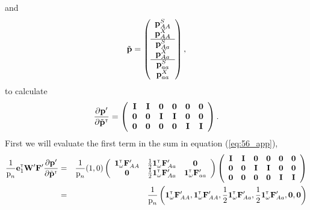 \documentclass[11pt]{article}
\newcommand{\bo}[1]{{\bf #1}}
\newcommand{\tr}{{\mbox{\tiny \sf T}}}
\begin{document}
and 
\begin{equation}
  \tilde{\bo p}=\left(\begin{array} {c}
\mathbf{p}_{AA}^S\\
\mathbf{p}_{AA}^X\\
\hline
\mathbf{p}_{Aa}^S\\
\mathbf{p}_{Aa}^X\\
\hline
\mathbf{p}_{aa}^S\\
\mathbf{p}_{aa}^X
  \end{array}\right),
\end{equation}
to calculate 
\begin{equation}
\frac{\partial  \mathbf{p}^\prime}{\partial \tilde{\bo p}^\tr} =  \left(\begin{array} {cccccc}
\mathbf{I}& \mathbf{I}& \mathbf{0}  &\mathbf{0} &\mathbf{0}  &\mathbf{0} \\
\mathbf{0} &\mathbf{0}  &\mathbf{I}& \mathbf{I}& \mathbf{0} &\mathbf{0} \\
\mathbf{0} &\mathbf{0}  &\mathbf{0} &\mathbf{0}  &  \mathbf{I}& \mathbf{I}
\end{array}\right).
\end{equation}
First we will evaluate the first term in the sum in equation (\ref{eq:56_app}),
\begin{eqnarray}
	 \frac{1}{ \mbox{p}_{n}}\mathbf{e}_1^\tr \mathbf{W}^\prime \mathbf{F}^\prime   \frac{\partial  \mathbf{p}^\prime}{\partial \tilde{\bo p}^\tr} &=&  \frac{1}{ \mbox{p}_{n}} (1,0) \left(\begin{array} {ccc}
\mathbf{1}^\tr_{\omega} \mathbf{F}_{AA}^\prime& \frac{1}{2}\mathbf{1}^\tr_{\omega} \mathbf{F}_{Aa}^\prime &\mathbf{0} \\
\mathbf{0} &\frac{1}{2}\mathbf{1}^\tr_{\omega} \mathbf{F}_{Aa}^\prime & \mathbf{1}^\tr_{\omega} \mathbf{F}_{aa}^\prime
\end{array}\right) \left(\begin{array} {cccccc}
\mathbf{I}& \mathbf{I}& \mathbf{0}  &\mathbf{0} &\mathbf{0}  &\mathbf{0} \\
\mathbf{0} &\mathbf{0}  &\mathbf{I}& \mathbf{I}& \mathbf{0} &\mathbf{0} \\
\mathbf{0} &\mathbf{0}  &\mathbf{0} &\mathbf{0}  &  \mathbf{I}& \mathbf{I}
\end{array}\right) \nonumber \\
&=& \frac{1}{ \mbox{p}_{n}} \left( \mathbf{1}^\tr_{\omega} \mathbf{F}_{AA}^\prime, \mathbf{1}^\tr_{\omega} \mathbf{F}_{AA}^\prime , \frac{1}{2}\mathbf{1}^\tr_{\omega} \mathbf{F}_{Aa}^\prime, \frac{1}{2}\mathbf{1}^\tr_{\omega} \mathbf{F}_{Aa}^\prime, \mathbf{0}, \mathbf{0} \right)\label{eq:first_term_app_reviewer}
\end{eqnarray}
\end{document}

